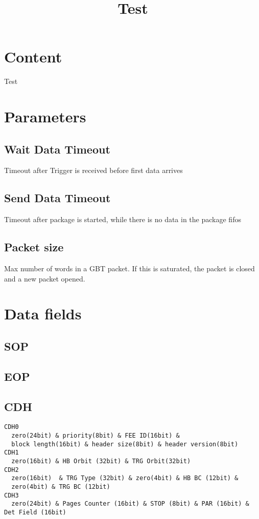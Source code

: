 \documentclass[a4paper,11pt,wide]{scrartcl}
\title{Test}
\begin{document}
\maketitle

\section{Content}
Test

\section{Parameters}

\subsection{Wait Data Timeout}
Timeout after Trigger is received before first data arrives

\subsection{Send Data Timeout}
Timeout after package is started, while there is no data in the
package fifos

\subsection{Packet size}

Max number of words in a GBT packet. If this is saturated, the packet
is closed and a new packet opened.

\section{Data fields}
\subsection{SOP}
\subsection{EOP}
\subsection{CDH}
\begin{verbatim}
CDH0
  zero(24bit) & priority(8bit) & FEE ID(16bit) &
  block length(16bit) & header size(8bit) & header version(8bit)
CDH1
  zero(16bit) & HB Orbit (32bit) & TRG Orbit(32bit)
CDH2
  zero(16bit)  & TRG Type (32bit) & zero(4bit) & HB BC (12bit) &
  zero(4bit) & TRG BC (12bit)
CDH3
  zero(24bit) & Pages Counter (16bit) & STOP (8bit) & PAR (16bit) & Det Field (16bit)
\end{verbatim}
\end{document}
